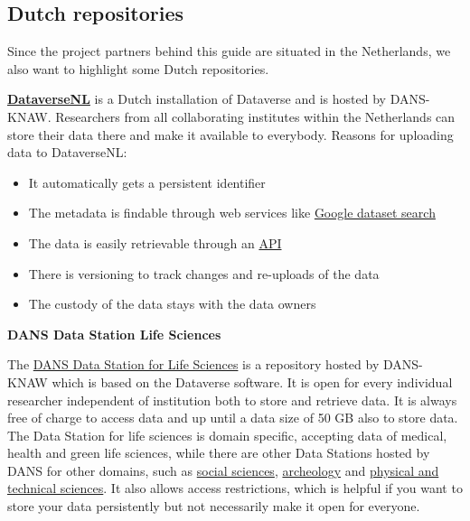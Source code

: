 \documentclass[
]{book}
\begin{document}
\hypertarget{dutch-repositories}{%
\subsection{Dutch repositories}\label{dutch-repositories}}

Since the project partners behind this guide are situated in the Netherlands, we also want to highlight some Dutch repositories.

\textbf{\href{https://dataverse.nl/}{DataverseNL}} is a Dutch installation of Dataverse and is hosted by DANS-KNAW. Researchers from all collaborating institutes within the Netherlands can store their data there and make it available to everybody. Reasons for uploading data to DataverseNL:

\begin{itemize}
\item
  It automatically gets a persistent identifier
\item
  The metadata is findable through web services like \href{https://datasetsearch.research.google.com/}{Google dataset search}
\item
  The data is easily retrievable through an \protect\hyperlink{API}{API}
\item
  There is versioning to track changes and re-uploads of the data
\item
  The custody of the data stays with the data owners
\end{itemize}

\textbf{DANS Data Station Life Sciences}

The \href{https://dans.knaw.nl/en/life-sciences/}{DANS Data Station for Life Sciences} is a repository hosted by DANS-KNAW which is based on the Dataverse software. It is open for every individual researcher independent of institution both to store and retrieve data. It is always free of charge to access data and up until a data size of 50 GB also to store data. The Data Station for life sciences is domain specific, accepting data of medical, health and green life sciences, while there are other Data Stations hosted by DANS for other domains, such as \href{https://dans.knaw.nl/en/social-sciences-and-humanities/}{social sciences}, \href{https://dans.knaw.nl/en/archaeology/}{archeology} and \href{https://dans.knaw.nl/en/physical-and-technical-sciences/}{physical and technical sciences}. It also allows access restrictions, which is helpful if you want to store your data persistently but not necessarily make it open for everyone.
\end{document}
